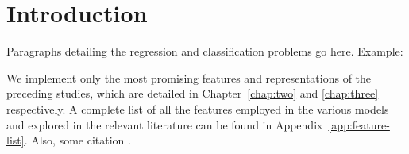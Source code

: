 \section{Introduction}
\label{chap:one}

Paragraphs detailing the regression and classification problems go here.
Example:

We implement only the most promising features and representations of the
preceding studies, which are detailed in Chapter~\ref{chap:two} and
\ref{chap:three} respectively.  A complete list of all the features employed in
the various models and explored in the relevant literature can be found in
Appendix~\ref{app:feature-list}.  Also, some citation \citet{bishop:2006}.

